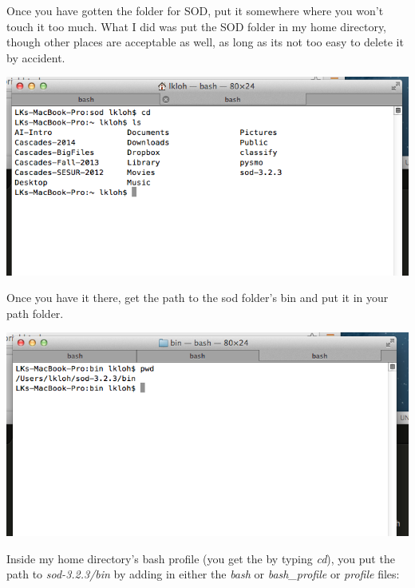 \documentclass[letterpaper,10pt,english]{sphinxmanual}
\begin{document}
Once you have gotten the folder for SOD, put it somewhere where you won't touch it too much. What I did was put the SOD folder in my home directory, though other places are acceptable as well, as long as its not too easy to delete it by accident.

\includegraphics{sod_location.png}

Once you have it there, get the path to the sod folder's bin and put it in your path folder.

\includegraphics{path_to_sod_bin.png}

Inside my home directory's bash profile (you get the by typing \emph{cd}), you put the path to \emph{sod-3.2.3/bin} by adding in either the \emph{bash} or \emph{bash\_profile} or \emph{profile} files:
\end{document}
